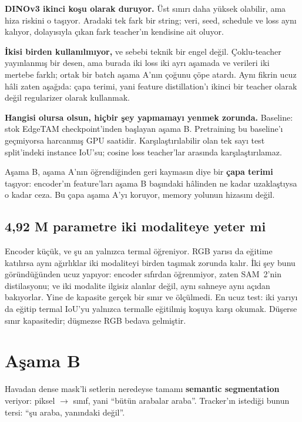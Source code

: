 \textbf{DINOv3 ikinci koşu olarak duruyor.} Üst sınırı daha yüksek olabilir,
ama hiza riskini o taşıyor. Aradaki tek fark bir string; veri, seed,
schedule ve loss aynı kalıyor, dolayısıyla çıkan fark teacher'ın kendisine
ait oluyor.

\textbf{İkisi birden kullanılmıyor,} ve sebebi teknik bir engel değil.
Çoklu-teacher yayınlanmış bir desen, ama burada iki loss iki ayrı aşamada
ve verileri iki mertebe farklı; ortak bir batch aşama A'nın çoğunu çöpe
atardı. Aynı fikrin ucuz hâli zaten aşağıda: çapa terimi, yani feature
distillation'ı ikinci bir teacher olarak değil regularizer olarak
kullanmak.

\textbf{Hangisi olursa olsun, hiçbir şey yapmamayı yenmek zorunda.}
Baseline: stok EdgeTAM checkpoint'inden başlayan aşama B. Pretraining bu
baseline'ı geçmiyorsa harcanmış GPU saatidir. Karşılaştırılabilir olan tek
sayı test split'indeki instance IoU'su; cosine loss teacher'lar arasında
karşılaştırılamaz.

Aşama B, aşama A'nın öğrendiğinden geri kaymasın diye bir \textbf{çapa
terimi} taşıyor: encoder'ın feature'ları aşama B başındaki hâlinden ne kadar
uzaklaştıysa o kadar ceza. Bu çapa aşama A'yı koruyor, memory yolunun
hizasını değil.

\subsection*{4,92 M parametre iki modaliteye yeter mi}

Encoder küçük, ve şu an yalnızca termal öğreniyor. RGB yarısı da eğitime
katılırsa aynı ağırlıklar iki modaliteyi birden taşımak zorunda kalır. İki
şey bunu göründüğünden ucuz yapıyor: encoder sıfırdan öğrenmiyor, zaten
SAM~2'nin distilasyonu; ve iki modalite ilgisiz alanlar değil, aynı sahneye
aynı açıdan bakıyorlar. Yine de kapasite gerçek bir sınır ve ölçülmedi. En
ucuz test: iki yarıyı da eğitip termal IoU'yu yalnızca termalle eğitilmiş
koşuya karşı okumak. Düşerse sınır kapasitedir; düşmezse RGB bedava
gelmiştir.

\section{Aşama B}
\label{sec:egitim-semantik}

Havadan dense mask'li setlerin neredeyse tamamı \textbf{semantic
segmentation} veriyor: piksel $\rightarrow$ sınıf, yani ``bütün arabalar
araba''. Tracker'ın istediği bunun tersi: ``şu araba, yanındaki değil''.

